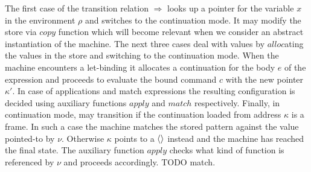 The first case of the transition relation $\Rightarrow$ looks up a pointer for the variable $x$ in the environment $\rho$ and switches to the continuation mode.
It may modify the store via $\mathit{copy}$ function which will become relevant when we consider an abstract instantiation of the machine.
The next three cases deal with values by $\mathit{alloc}$ating the values in the store and switching to the continuation mode.
When the machine encounters a let-binding it allocates a continuation for the body $e$ of the expression and proceeds to evaluate the bound command $c$ with the new pointer $\kappa'$.
In case of applications and match expressions the resulting configuration is decided using auxiliary functions $\mathit{apply}$ and $\mathit{match}$ respectively.
Finally, in continuation mode, may transition if the continuation loaded from address $\kappa$ is a frame.
In such a case the machine matches the stored pattern against the value pointed-to by $\nu$.
Otherwise $\kappa$ points to a $\left<  \right>$ instead and the machine has reached the final state.
The auxiliary function $\mathit{apply}$ checks what kind of function is referenced by $\nu$ and proceeds accordingly.
TODO match.

